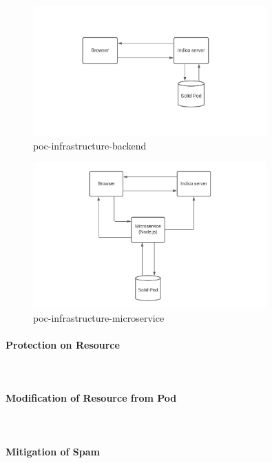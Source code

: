 \begin{figure}
    \centering
    \includegraphics[width=0.8\textwidth]{prototype/graphs/poc-infrastructure-backend.jpeg}
    \caption{poc-infrastructure-backend}
    \label{fig:poc-infrastructure-backend}
\end{figure}


\begin{figure}
    \centering
    \includegraphics[width=0.8\textwidth]{prototype/graphs/poc-infrastructure-microservice.jpeg}
    \caption{poc-infrastructure-microservice}
    \label{fig:poc-infrastructure-microservice}
\end{figure}


\paragraph{Protection on Resource}\mbox{}\\

\paragraph{Modification of Resource from Pod}\mbox{}\\

\paragraph{Mitigation of Spam}\mbox{}\\


